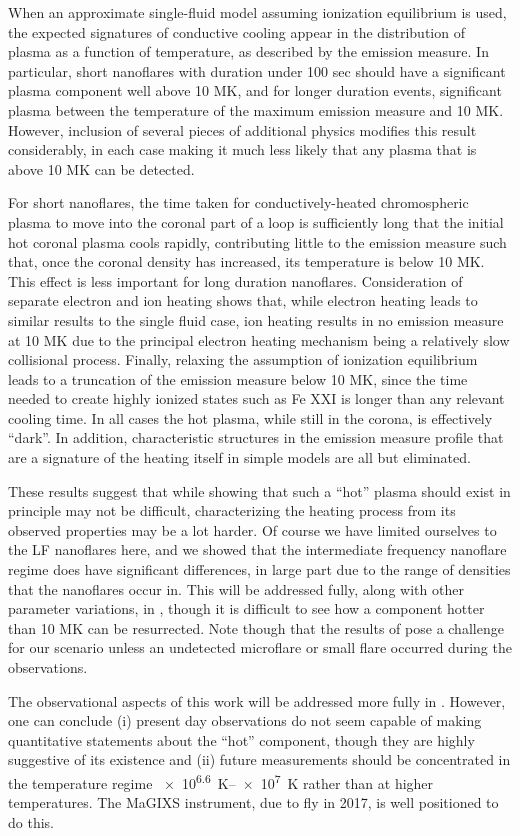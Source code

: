 When an approximate single-fluid model assuming ionization equilibrium is used, the expected signatures of conductive cooling appear in the distribution of plasma as a function of temperature, as described by the emission measure. In particular, short nanoflares with duration under 100 sec should have a significant plasma component well above 10 MK, and for longer duration events, significant plasma between the temperature of the maximum emission measure and 10 MK. However, inclusion of several pieces of additional physics modifies this result considerably, in each case making it much less likely that any plasma that is above 10 MK can be detected.

For short nanoflares, the time taken for conductively-heated chromospheric plasma to move into the coronal part of a loop is sufficiently long that the initial hot coronal plasma cools rapidly, contributing little to the emission measure such that, once the coronal density has increased, its temperature is below 10 MK. This effect is less important for long duration nanoflares. Consideration of separate electron and ion heating shows that, while electron heating leads to similar results to the single fluid case, ion heating results in no emission measure at 10 MK due to the principal electron heating mechanism being a relatively slow collisional process. Finally, relaxing the assumption of ionization equilibrium leads to a truncation of the emission measure below 10 MK, since the time needed to create highly ionized states such as Fe XXI is longer than any relevant cooling time. In all cases the hot plasma, while still in the corona, is effectively ``dark''. In addition, characteristic structures in the emission measure profile that are a signature of the heating itself in simple models are all but eliminated.

These results suggest that while showing that such a ``hot'' plasma should exist in principle may not be difficult, characterizing the heating process from its observed properties may be a lot harder. Of course we have limited ourselves to the LF nanoflares here, and we showed \citep{cargill_active_2014} that the intermediate frequency nanoflare regime does have significant differences, in large part due to the range of densities that the nanoflares occur in. This will be addressed fully, along with other parameter variations, in , though it is difficult to see how a component hotter than 10 MK can be resurrected. Note though that the results of \citet{caspi_new_2015} pose a challenge for our scenario unless an undetected microflare or small flare occurred during the observations.

The observational aspects of this work will be addressed more fully in . However, one can conclude (i) present day observations do not seem capable of making quantitative statements about the ``hot'' component, though they are highly suggestive of its existence and (ii) future measurements should be concentrated in the temperature regime \SIrange{e6.6}{e7}{\kelvin} rather than at higher temperatures. The MaGIXS instrument, due to fly in 2017, is well positioned to do this.
